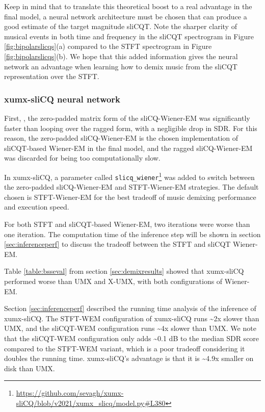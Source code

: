 \documentclass[report.tex]{subfiles}
\begin{document}
Keep in mind that to translate this theoretical boost to a real advantage in the final model, a neural network architecture must be chosen that can produce a good estimate of the target magnitude sliCQT. Note the sharper clarity of musical events in both time and frequency in the sliCQT spectrogram in Figure \ref{fig:bipolarslicqs}(a) compared to the STFT spectrogram in Figure \ref{fig:bipolarslicqs}(b). We hope that this added information gives the neural network an advantage when learning how to demix music from the sliCQT representation over the STFT.

\subsubsection{xumx-sliCQ neural network}
\label{sec:netdiscuss}

First, , the zero-padded matrix form of the sliCQ-Wiener-EM was significantly faster than looping over the ragged form, with a negligible drop in SDR. For this reason, the zero-padded sliCQ-Wiener-EM is the chosen implementation of sliCQT-based Wiener-EM in the final model, and the ragged sliCQ-Wiener-EM was discarded for being too computationally slow.

In xumx-sliCQ, a parameter called \Verb#slicq_wiener#\footnote{\url{https://github.com/sevagh/xumx-sliCQ/blob/v2021/xumx_slicq/model.py\#L380}} was added to switch between the zero-padded sliCQ-Wiener-EM and STFT-Wiener-EM strategies. The default chosen is STFT-Wiener-EM for the best tradeoff of music demixing performance and execution speed.

For both STFT and sliCQT-based Wiener-EM, two iterations were worse than one iteration. The computation time of the inference step will be shown in section \ref{sec:inferenceperf} to discuss the tradeoff between the STFT and sliCQT Wiener-EM.


Table \ref{table:bsseval} from section \ref{sec:demixresults} showed that xumx-sliCQ performed worse than UMX and X-UMX, with both configurations of Wiener-EM.

Section \ref{sec:inferenceperf} described the running time analysis of the inference of xumx-sliCQ. The STFT-WEM configuration of xumx-sliCQ runs \textasciitilde2x slower than UMX, and the sliCQT-WEM configuration runs \textasciitilde4x slower than UMX. We note that the sliCQT-WEM configuration only adds \textasciitilde0.1 dB to the median SDR score compared to the STFT-WEM variant, which is a poor tradeoff considering it doubles the running time. xumx-sliCQ's advantage is that it is \textasciitilde4.9x smaller on disk than UMX.
\end{document}
